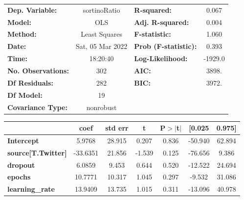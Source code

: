 \begin{center}
\begin{tabular}{lclc}
\toprule
\textbf{Dep. Variable:}                   &   sortinoRatio   & \textbf{  R-squared:         } &     0.067   \\
\textbf{Model:}                           &       OLS        & \textbf{  Adj. R-squared:    } &     0.004   \\
\textbf{Method:}                          &  Least Squares   & \textbf{  F-statistic:       } &     1.060   \\
\textbf{Date:}                            & Sat, 05 Mar 2022 & \textbf{  Prob (F-statistic):} &    0.393    \\
\textbf{Time:}                            &     18:20:40     & \textbf{  Log-Likelihood:    } &   -1929.0   \\
\textbf{No. Observations:}                &         302      & \textbf{  AIC:               } &     3898.   \\
\textbf{Df Residuals:}                    &         282      & \textbf{  BIC:               } &     3972.   \\
\textbf{Df Model:}                        &          19      & \textbf{                     } &             \\
\textbf{Covariance Type:}                 &    nonrobust     & \textbf{                     } &             \\
\bottomrule
\end{tabular}
\begin{tabular}{lcccccc}
                                          & \textbf{coef} & \textbf{std err} & \textbf{t} & \textbf{P$> |$t$|$} & \textbf{[0.025} & \textbf{0.975]}  \\
\midrule
\textbf{Intercept}                        &       5.9768  &       28.915     &     0.207  &         0.836        &      -50.940    &       62.894     \\
\textbf{source[T.Twitter]}                &     -33.6351  &       21.856     &    -1.539  &         0.125        &      -76.656    &        9.386     \\
\textbf{dropout}                          &       6.0859  &        9.453     &     0.644  &         0.520        &      -12.522    &       24.694     \\
\textbf{epochs}                           &      10.7771  &       10.317     &     1.045  &         0.297        &       -9.532    &       31.086     \\
\textbf{learning\_rate}                   &      13.9409  &       13.735     &     1.015  &         0.311        &      -13.096    &       40.978     \\

\end{tabular}
\end{center}
